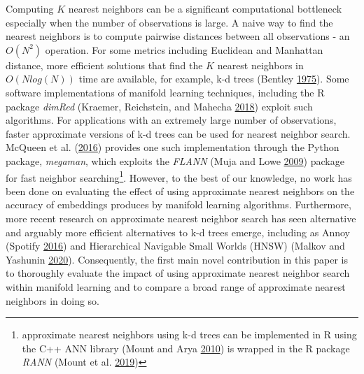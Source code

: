 \documentclass[12pt]{article}
\begin{document}
Computing \(K\) nearest neighbors can be a significant computational bottleneck especially when the number of observations is large. A naive way to find the nearest neighbors is to compute pairwise distances between all observations - an \(O(N^2)\) operation. For some metrics including Euclidean and Manhattan distance, more efficient solutions that find the \(K\) nearest neighbors in \(O(Nlog(N))\) time are available, for example, k-d trees (Bentley \protect\hyperlink{ref-Bentley1975-zo}{1975}). Some software implementations of manifold learning techniques, including the R package \emph{dimRed} (Kraemer, Reichstein, and Mahecha \protect\hyperlink{ref-Kraemer2018-zf}{2018}) exploit such algorithms. For applications with an extremely large number of observations, faster approximate versions of k-d trees can be used for nearest neighbor search. McQueen et al. (\protect\hyperlink{ref-McQueen2016-xz}{2016}) provides one such implementation through the Python package, \emph{megaman}, which exploits the \emph{FLANN} (Muja and Lowe \protect\hyperlink{ref-Muja2009-de}{2009}) package for fast neighbor searching\footnote{approximate nearest neighbors using k-d trees can be implemented in R using the C++ ANN library (Mount and Arya \protect\hyperlink{ref-mount2010-ann}{2010}) is wrapped in the R package \emph{RANN} (Mount et al. \protect\hyperlink{ref-jefferislab2019-l2}{2019})}. However, to the best of our knowledge, no work has been done on evaluating the effect of using approximate nearest neighbors on the accuracy of embeddings produces by manifold learning algorithms. Furthermore, more recent research on approximate nearest neighbor search has seen alternative and arguably more efficient alternatives to k-d trees emerge, including as Annoy (Spotify \protect\hyperlink{ref-Bernhardsson2016-tf}{2016}) and Hierarchical Navigable Small Worlds (HNSW) (Malkov and Yashunin \protect\hyperlink{ref-Malkov2020-jp}{2020}). Consequently, the first main novel contribution in this paper is to thoroughly evaluate the impact of using approximate nearest neighbor search within manifold learning and to compare a broad range of approximate nearest neighbors in doing so.
\end{document}
